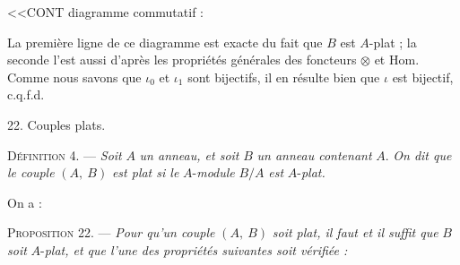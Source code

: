 
<<CONT diagramme commutatif :

\begin{center}
\end{center}
La première ligne de ce diagramme est exacte du fait que $B$ est $A$-plat ; la seconde l'est aussi d'après les propriétés générales des foncteurs $\otimes$ et Hom. Comme nous savons que $\iota_0$ et $\iota_1$ sont bijectifs, il en résulte bien que $\iota$ est bijectif, c.q.f.d.


22. Couples plats.

\textsc{Définition} 4. --- \textit{Soit} $A$ \textit{un anneau, et soit} $B$ \textit{un anneau contenant} $A$. \textit{On dit que le couple} $(A,\ B)$ \textit{est plat si le} $A$-\textit{module} $B/A$ \textit{est} $A$-\textit{plat.}

On a :

\textsc{Proposition} 22. --- \textit{Pour qu'un couple} $(A,\ B)$ \textit{soit plat, il faut et il suffit que} $B$ \textit{soit} $A$-\textit{plat, et que l'une des propriétés suivantes soit vérifiée :}

